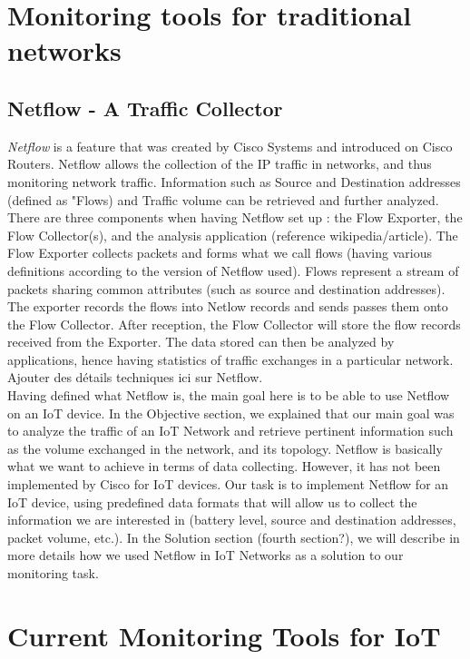 \section{Monitoring tools for traditional networks}

\subsection{Netflow - A Traffic Collector}
\textit{Netflow} is a feature that was created by Cisco Systems and introduced on Cisco Routers. Netflow allows the collection of the IP traffic in networks, and thus monitoring network traffic. Information such as Source and Destination addresses (defined as "Flows) and Traffic volume can be retrieved and further analyzed.\\

There are three components when having Netflow set up : the Flow Exporter, the Flow Collector(s), and the analysis application (reference wikipedia/article). The Flow Exporter collects packets and forms what we call flows (having various definitions according to the version of Netflow used). Flows represent a stream of packets sharing common attributes (such as source and destination addresses). The exporter records the flows into Netlow records and sends passes them onto the Flow Collector. After reception, the Flow Collector will store the flow records received from the Exporter. The data stored can then be analyzed by applications, hence having statistics of traffic exchanges in a particular network.\\

Ajouter des détails techniques ici sur Netflow.\\

Having defined what Netflow is, the main goal here is to be able to use Netflow on an IoT device. In the Objective section, we explained that our main goal was to analyze the traffic of an IoT Network and retrieve pertinent information such as the volume exchanged in the network, and its topology. Netflow is basically what we want to achieve in terms of data collecting. However, it has not been implemented by Cisco for IoT devices. Our task is to implement Netflow for an IoT device, using predefined data formats that will allow us to collect the information we are interested in (battery level, source and destination addresses, packet volume, etc.). In the Solution section (fourth section?), we will describe in more details how we used Netflow in IoT Networks as a solution to our monitoring task.

\section{Current Monitoring Tools for IoT}
